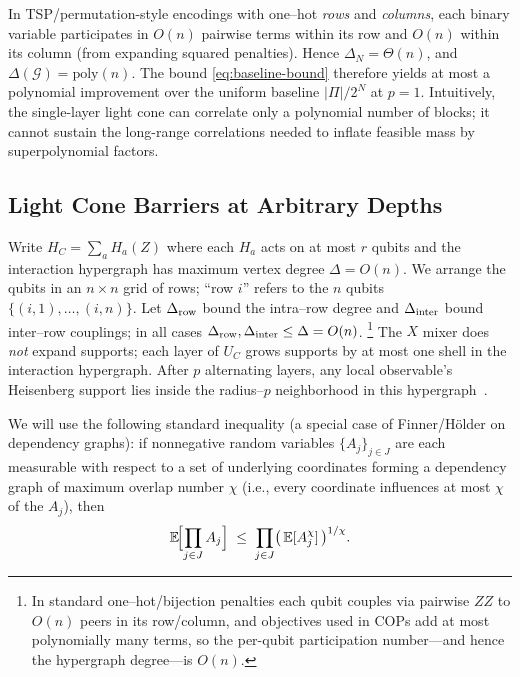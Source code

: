 \documentclass[a4paper,onecolumn,11pt,unpublished]{quantumarticle}
\theoremstyle{remark}
\begin{document}
In TSP/permutation-style encodings with one–hot \emph{rows} and \emph{columns}, each binary variable
participates in \(O(n)\) pairwise terms within its row and \(O(n)\) within its column (from expanding squared penalties).
Hence \(\Delta_N=\Theta(n)\), and \(\Delta(\mathcal G)=\mathrm{poly}(n)\). The bound \eqref{eq:baseline-bound}
therefore yields at most a polynomial improvement over the uniform baseline \(|\Pi|/2^N\) at \(p=1\).
Intuitively, the single-layer light cone can correlate only a polynomial number of blocks; it cannot sustain the long-range correlations needed to inflate feasible mass by superpolynomial factors.
\medskip
















\subsection{Light Cone Barriers at Arbitrary Depths}
\label{app:fixed_p}

Write $H_C=\sum_a H_a(Z)$ where each $H_a$ acts on at most $r$ qubits and the
interaction hypergraph has maximum vertex degree $\Delta = O(n)$.
We arrange the qubits in an $n\times n$ grid of rows; “row $i$” refers to the $n$
qubits $\{(i,1),\dots,(i,n)\}$. Let $\Delta_{\rm row}$ bound the intra–row degree
and $\Delta_{\rm inter}$ bound inter–row couplings; in all cases
$\Delta_{\rm row},\Delta_{\rm inter}\le \Delta=O(n)$.%
\footnote{In standard one–hot/bijection penalties each qubit couples via
pairwise $ZZ$ to $O(n)$ peers in its row/column, and objectives used in COPs
add at most polynomially many terms, so the per-qubit participation number—and
hence the hypergraph degree—is $O(n)$.}
The $X$ mixer does \emph{not} expand supports; each layer of $U_C$ grows supports
by at most one shell in the interaction hypergraph. After $p$ alternating layers,
any local observable’s Heisenberg support lies inside the radius–$p$ neighborhood
in this hypergraph~\cite{Hastings2010Locality}.



We will use the following standard inequality (a special case of Finner/Hölder on dependency graphs\cite{Finner1992}): if nonnegative random variables $\{A_j\}_{j\in J}$ are
each measurable with respect to a set of underlying coordinates forming a
dependency graph of maximum overlap number $\chi$ (i.e., every coordinate
influences at most $\chi$ of the $A_j$), then
\begin{equation}
\label{eq:finner}
  \mathbb{E}\!\Bigl[\prod_{j\in J} A_j\Bigr]
  \;\le\;
  \prod_{j\in J} \bigl(\,\mathbb{E}[A_j^{\chi}]\,\bigr)^{1/\chi}.
\end{equation}
\end{document}
